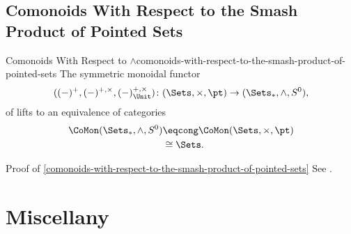 \subsection{Comonoids With Respect to the Smash Product of Pointed Sets}\label{subsection-comonoids-with-respect-to-the-smash-product-of-pointed-sets}
\begin{proposition}{Comonoids With Respect to $\wedge$}{comonoids-with-respect-to-the-smash-product-of-pointed-sets}%
    The symmetric monoidal functor
    \[
        ((-)^{+},(-)^{+,\times},(-)^{+,\times}_{\Unit})
        \colon
        (\Sets,\times,\pt)
        \to
        (\Sets_{*},\wedge,S^{0}),
    \]%
    of  lifts to an equivalence of categories
    \begin{align*}
        \CoMon(\Sets_{*},\wedge,S^{0}) &\eqcong \CoMon(\Sets,\times,\pt)\\
                                       &\cong   \Sets.
    \end{align*}
\end{proposition}
\begin{Proof}{Proof of \cref{comonoids-with-respect-to-the-smash-product-of-pointed-sets}}%
    See \cite[Lemma 2.4]{coalgebras-in-symmetric-monoidal-categories-of-spectra}.
\end{Proof}
\section{Miscellany}\label{section-tensor-products-of-pointed-sets-miscellany}
